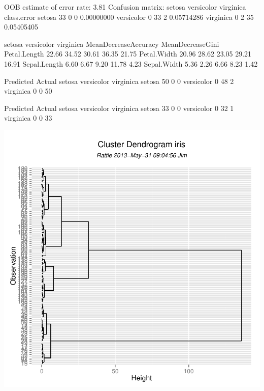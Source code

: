 \documentclass{article}
\begin{document}
\begin{Schunk}
\begin{Soutput}
        OOB estimate of  error rate: 3.81%
Confusion matrix:
           setosa versicolor virginica class.error
setosa         33          0         0  0.00000000
versicolor      0         33         2  0.05714286
virginica       0          2        35  0.05405405
\end{Soutput}
\begin{Soutput}
             setosa versicolor virginica MeanDecreaseAccuracy MeanDecreaseGini
Petal.Length  22.66      34.52     30.61                36.35            21.75
Petal.Width   20.96      28.62     23.05                29.21            16.91
Sepal.Length   6.60       6.67      9.20                11.78             4.23
Sepal.Width    5.36       2.26      6.66                 8.23             1.42
\end{Soutput}
\begin{Soutput}
            Predicted
Actual       setosa versicolor virginica
  setosa         50          0         0
  versicolor      0         48         2
  virginica       0          0        50
\end{Soutput}
\begin{Soutput}
            Predicted
Actual       setosa versicolor virginica
  setosa         33          0         0
  versicolor      0         32         1
  virginica       0          0        33
\end{Soutput}
\end{Schunk}
\includegraphics{rattleOutput-mychunk}
\end{document}
